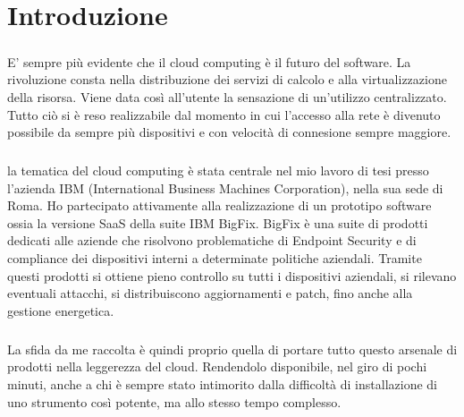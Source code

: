\chapter{Introduzione}

\paragraph{}
 E' sempre più evidente che il cloud computing è il futuro del software. La rivoluzione consta nella distribuzione dei servizi di calcolo e alla virtualizzazione della risorsa. Viene data così all'utente la sensazione di un'utilizzo centralizzato. Tutto ciò si è reso realizzabile dal momento in cui l'accesso alla rete è divenuto possibile da sempre più dispositivi e con velocità di connesione sempre maggiore.
 \paragraph{}
 la tematica del cloud computing è stata centrale nel mio lavoro di tesi presso l'azienda IBM (International Business Machines Corporation), nella sua sede di Roma. Ho partecipato attivamente alla realizzazione di un prototipo software ossia la versione SaaS della suite IBM BigFix. BigFix è una suite di prodotti dedicati alle aziende che risolvono problematiche di Endpoint Security e di compliance dei dispositivi interni a determinate politiche aziendali. Tramite questi prodotti si ottiene pieno controllo su tutti i dispositivi aziendali, si rilevano eventuali attacchi, si distribuiscono aggiornamenti e patch, fino anche alla gestione energetica.
 \paragraph{}
 La sfida da me raccolta è quindi proprio quella di portare tutto questo arsenale di prodotti nella leggerezza del cloud. Rendendolo disponibile, nel giro di pochi minuti, anche a chi è sempre stato intimorito dalla difficoltà di installazione di uno strumento così potente, ma allo stesso tempo complesso.